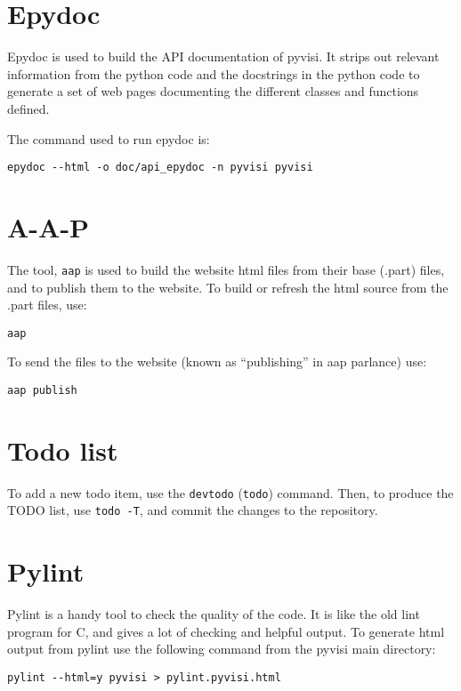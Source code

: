 \documentclass[12pt,a4paper]{article}
\begin{document}
\section{Epydoc}

Epydoc is used to build the API documentation of pyvisi.  It strips out
relevant information from the python code and the docstrings in the python
code to generate a set of web pages documenting the different classes and
functions defined.

The command used to run epydoc is:
\begin{verbatim}
epydoc --html -o doc/api_epydoc -n pyvisi pyvisi
\end{verbatim}

\section{A-A-P}

The tool, \texttt{aap} is used to build the website html files from their base
(.part) files, and to publish them to the website.  To build or refresh the
html source from the .part files, use:
\begin{verbatim}
aap
\end{verbatim}
To send the files to the website (known as ``publishing'' in aap parlance)
use:
\begin{verbatim}
aap publish
\end{verbatim}

\section{Todo list}

To add a new todo item, use the \texttt{devtodo} (\texttt{todo}) command.
Then, to produce the TODO list, use \texttt{todo -T}, and commit the changes
to the repository.

\section{Pylint}

Pylint is a handy tool to check the quality of the code.  It is like the old
lint program for C, and gives a lot of checking and helpful output.  To
generate html output from pylint use the following command from the pyvisi
main directory:
\begin{verbatim}
pylint --html=y pyvisi > pylint.pyvisi.html
\end{verbatim}
\end{document}
